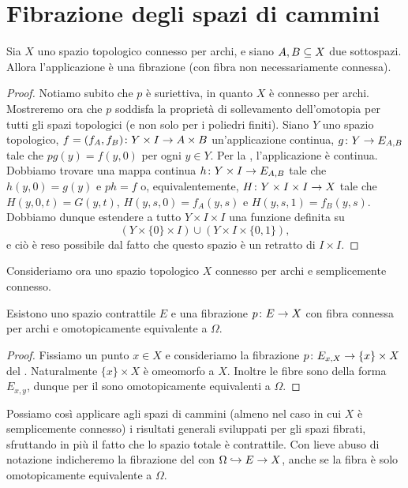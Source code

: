 \section{Fibrazione degli spazi di cammini}
\begin{theorem}
Sia \(X\) uno spazio topologico connesso per archi, e siano \(A,B\subseteq X\) due sottospazi. Allora l'applicazione
è una fibrazione (con fibra non necessariamente connessa).
\end{theorem}
\begin{proof}
Notiamo subito che \(p\) è suriettiva, in quanto \(X\) è connesso per archi. Mostreremo ora che \(p\) soddisfa la proprietà di sollevamento dell'omotopia per tutti gli spazi topologici (e non solo per i poliedri finiti). Siano \(Y\) uno spazio topologico, \(\map{f=(f_A,f_B)}{Y\times I}{A\times B}\) un'applicazione continua, \(\map{g}{Y}{E_{A,B}}\) tale che \(pg(y)=f(y,0)\) per ogni \(y\in Y\). Per la , l'applicazione
è continua. Dobbiamo trovare una mappa continua \(\map{h}{Y\times I}{E_{A,B}}\) tale che \(h(y,0)=g(y)\) e \(ph=f\) o, equivalentemente, \(\map{H}{Y\times I\times I}{X}\) tale che \(H(y,0,t)=G(y,t)\), \(H(y,s,0)=f_A(y,s)\) e \(H(y,s,1)=f_B(y,s)\). Dobbiamo dunque estendere a tutto \(Y\times I\times I\) una funzione definita su
\[
(Y\times\{0\}\times I)\cup(Y\times I\times \{0,1\}),
\]
e ciò è reso possibile dal fatto che questo spazio è un retratto di \(I\times I\).
\end{proof}

Consideriamo ora uno spazio topologico \(X\) connesso per archi e semplicemente connesso.

\begin{corollary}
Esistono uno spazio contrattile \(E\) e una fibrazione \(\map{p}{E}{X}\) con fibra connessa per archi e omotopicamente equivalente a \(\Omega\).
\end{corollary}
\begin{proof}
Fissiamo un punto \(x\in X\) e consideriamo la fibrazione \(\map{p}{E_{x,X}}{\{x\}\times X}\) del . Naturalmente \(\{x\}\times X\) è omeomorfo a \(X\). Inoltre le fibre sono della forma \(E_{x,y}\), dunque per il  sono omotopicamente equivalenti a \(\Omega\).
\end{proof}

Possiamo così applicare agli spazi di cammini (almeno nel caso in cui \(X\) è semplicemente connesso) i risultati generali sviluppati per gli spazi fibrati, sfruttando in più il fatto che lo spazio totale è contrattile. Con lieve abuso di notazione indicheremo la fibrazione del  con \(\Omega\hookrightarrow E\to X\), anche se la fibra è solo omotopicamente equivalente a \(\Omega\).

